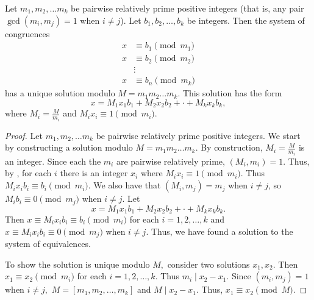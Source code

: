 \documentclass{../ximera}
\begin{document}
\begin{thm*}\label{CRT}
    Let $m_1,m_2,\dots m_k$ be pairwise relatively prime positive integers (that is, any pair $\gcd(m_i,m_j)=1$ when $i\neq j$). Let $b_1, b_2,\dots, b_k$ be integers. Then the system of congruences 
   \begin{align*}
    x&\equiv b_1 \pmod{m_1}\\
    x&\equiv b_2 \pmod{m_2}\\
       &\vdots\\
     x&\equiv b_n \pmod{m_k}
   \end{align*}
   has a unique solution modulo $M=m_1m_2\dots m_k$. This solution has the form 
   \[x=M_1x_1b_1+M_2x_2b_2+\cdot+M_kx_kb_k,\] where $M_i=\frac{M}{m_i}$ and $M_i x_i\equiv 1 \pmod{m_i}$.
   \end{thm*}
   \begin{proof} Let $m_1,m_2,\dots m_k$ be pairwise relatively prime positive integers.
    We start by constructing a solution modulo $M=m_1m_2\dots m_k$. By construction, $M_i=\frac{M}{m_i}$ is an integer. Since each the $m_i$ are pairwise relatively prime, $\left(M_i, m_i\right)=1$. Thus, by , for each $i$ there is an integer $x_i$ where $M_i x_i\equiv 1 \pmod{m_i}$. Thus $M_i x_i b_i\equiv b_i\pmod{m_i}$. We also have that $(M_i, m_j)=m_j$ when $i\neq j$, so $M_i b_i\equiv 0 \pmod{m_j}$ when $i\neq j$.  Let 
    \[x=M_1x_1b_1+M_2x_2b_2+\cdot+M_kx_kb_k.\] 
    Then $x\equiv M_i x_i b_i\equiv b_i\pmod{m_i}$ for each $i=1,2,\dots,k$ and $x\equiv M_i x_i b_i\equiv 0\pmod{m_j}$ when $i\neq j.$ Thus, we have found a solution to the system of equivalences.
    
    To show the solution is unique modulo $M,$ consider two solutions $x_1,x_2.$ Then $x_1\equiv x_2\pmod{m_i}$ for each $i=1,2,\dots,k.$ Thus $m_i\mid x_2-x_1$. Since $(m_i,m_j)=1$ when $i\neq j,$ $M=[m_1,m_2,\dots,m_k]$ and $M\mid x_2-x_1.$ Thus, $x_1\equiv x_2\pmod M.$ 
   \end{proof}
   

\end{document}
